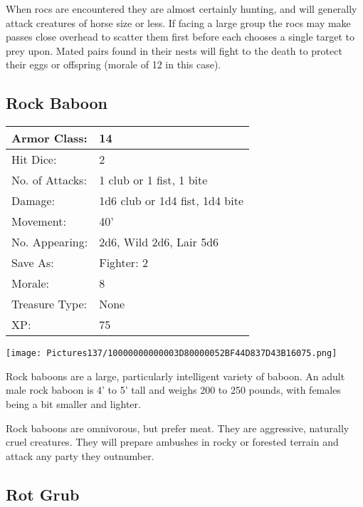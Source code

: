 \documentclass[a4paper,twoside,openany,10pt]{book}
\begin{document}
\begin{multicols}{2}
When rocs are encountered they are almost certainly hunting, and will generally attack creatures of horse size or less. If facing a large group the rocs may make passes close overhead to scatter them first before each chooses a single target to prey upon. Mated pairs found in their nests will fight to the death to protect their eggs or offspring (morale of 12 in this case). 


\subsection*{Rock Baboon}\label{rock-baboon}

\begin{tabularx}{0.50\textwidth}{@{}lX@{}}

Armor Class: & 14 \\\hline
Hit Dice: & 2 \\\hline
No. of Attacks: & 1 club or 1 fist, 1 bite \\\hline
Damage: & 1d6 club or 1d4 fist, 1d4 bite \\\hline
Movement: & 40' \\\hline
No. Appearing: & 2d6, Wild 2d6, Lair 5d6 \\\hline
Save As: & Fighter: 2 \\\hline
Morale: & 8 \\\hline
Treasure Type: & None \\\hline
XP: & 75 \\\hline
\end{tabularx}\medskip

\begin{center} \texttt{[image: Pictures137/10000000000003D80000052BF44D837D43B16075.png]} \end{center}

Rock baboons are a large, particularly intelligent variety of baboon. An adult male rock baboon is 4' to 5' tall and weighs 200 to 250 pounds, with females being a bit smaller and lighter.

Rock baboons are omnivorous, but prefer meat. They are aggressive, naturally cruel creatures. They will prepare ambushes in rocky or forested terrain and attack any party they outnumber.



\subsection*{Rot Grub}\label{rot-grub}


\end{multicols}
\end{document}
